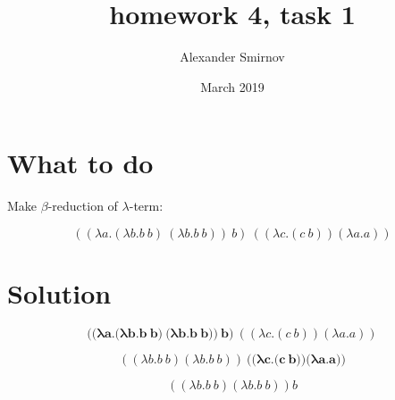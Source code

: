 \documentclass{article}
\title{homework 4, task 1}
\author{Alexander Smirnov}
\date{March 2019}
\begin{document}
\maketitle

\section{What to do}
Make $\beta$-reduction of $\lambda$-term:

$$((\lambda a.(\lambda b.b\:b)\:(\lambda b.b\:b))\:b)\:((\lambda c.(c\:b)) (\lambda a.a))$$

\section{Solution}

$$\textbf{(}\mathbf{\textbf{(} \lambda a.\textbf{(}\lambda b.b\:b\textbf{)}\:\textbf{(}\lambda b.b\:b\textbf{)}\textbf{)}\:b}\textbf{)}\:((\lambda c.(c\:b)) (\lambda a.a))$$

$$((\lambda b.b\:b)(\lambda b.b\:b))\mathbf{\:\textbf{(}\textbf{(}\lambda c.\textbf{(}c\:b\textbf{)}\textbf{)} \textbf{(}\lambda a.a\textbf{)}\textbf{)}}$$


$$((\lambda b.b\:b)(\lambda b.b\:b))b$$
\end{document}
